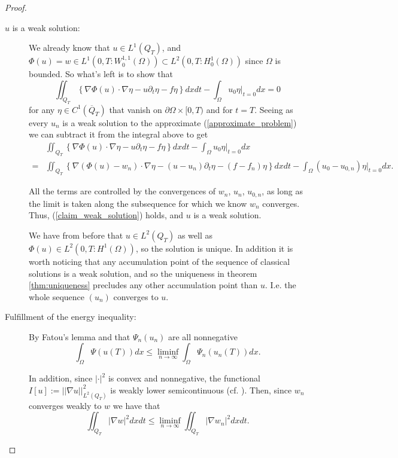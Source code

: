 \documentclass[11pt, a4paper]{article}
\begin{document}
\begin{proof}
\begin{description}
	\item[$u$ is a weak solution:] We already know that $u \in L^1(Q_T)$, and $\Phi(u)=w \in L^1(0,T: W^{1,1}_0(\Omega))\subset L^2(0,T: H^1_0(\Omega))$ since $\Omega$ is bounded. So what's left is to show that
	\begin{equation}
	\label{claim_weak_solution}
	\iint_{Q_T}\left\{ \nabla\Phi(u) \cdot \nabla \eta - u\partial_t \eta - f\eta \right\}dxdt - \int_\Omega u_0\eta\big|_{t=0}dx = 0
	\end{equation}
	for any $\eta \in C^1(\overline{Q}_T)$ that vanish on $\partial \Omega \times [0,T)$ and for $t=T$. Seeing as every $u_n$ is a weak solution to the approximate (\ref{approximate_problem}) we can subtract it from the integral above to get
	\begin{align*}
	&\iint_{Q_T}\left\{ \nabla\Phi(u) \cdot \nabla \eta - u\partial_t \eta - f\eta \right\}dxdt - \int_\Omega u_0\eta\big|_{t=0}dx \\
	= &\iint_{Q_T}\left\{ \nabla(\Phi(u)-w_n) \cdot \nabla \eta - (u-u_n)\partial_t \eta - (f-f_n)\eta \right\}dxdt - \int_\Omega (u_0-u_{0,n})\eta\big|_{t=0}dx.
	\end{align*}
	
	All the terms are controlled by the convergences of $w_n$, $u_n$, $u_{0,n}$, as long as the limit is taken along the subsequence for which we know $w_n$ converges. Thus, (\ref{claim_weak_solution}) holds, and $u$ is a weak solution.
	
	
	We have from before that $u\in L^2(Q_T)$ as well as $\Phi(u) \in L^2(0,T: H^1(\Omega))$, so the solution is unique. In addition it is worth noticing that any accumulation point of the sequence of classical solutions is a weak solution, and so the uniqueness in theorem \ref{thm:uniqueness} precludes any other accumulation point than $u$. I.e. the whole sequence $(u_n)$ converges to $u$.


	\item[Fulfillment of the energy inequality:]
	By Fatou's lemma \citep[p. 162]{weiss1999course} and that $\Psi_n(u_n)$ are all nonnegative
	\begin{equation}
	\int_\Omega \Psi(u(T)) dx \leq \liminf_{n \to \infty} \int_\Omega \Psi_n(u_n(T))dx.
	\end{equation}
	
	In addition, since $|\cdot|^2$ is convex and nonnegative, the functional $I[u]:= ||\nabla u||^2_{L^2(Q_T)}$ is weakly lower semicontinuous (cf. \citep[Theorem 1, p. 468]{evans}). Then, since $w_n$ converges weakly to $w$ we have that
	\begin{equation}
	\iint_{Q_T}|\nabla w|^2 dxdt \leq \liminf_{n \to \infty} \iint_{Q_T} |\nabla w_n|^2 dxdt.
	\end{equation}
	

\end{description}
\end{proof}
\end{document}

